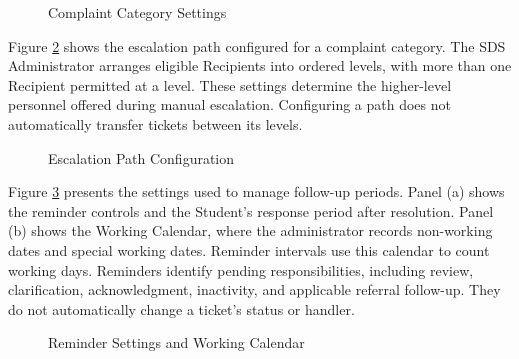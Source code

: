 \renewcommand{\thefigure}{5.37}
\begin{figure}[htbp]
    \centering
    \par{}\par
    \medskip
    \par{}\par
    \caption{Complaint Category Settings}
    \label{fig:cat}
\end{figure}
\FloatBarrier

Figure \ref{fig:path} shows the escalation path configured for a complaint category. The SDS Administrator arranges eligible Recipients into ordered levels, with more than one Recipient permitted at a level. These settings determine the higher-level personnel offered during manual escalation. Configuring a path does not automatically transfer tickets between its levels.

\renewcommand{\thefigure}{5.38}
\begin{figure}[htbp]
    \centering
    \caption{Escalation Path Configuration}
    \label{fig:path}
\end{figure}
\FloatBarrier

Figure \ref{fig:remind} presents the settings used to manage follow-up periods. Panel (a) shows the reminder controls and the Student's response period after resolution. Panel (b) shows the Working Calendar, where the administrator records non-working dates and special working dates. Reminder intervals use this calendar to count working days. Reminders identify pending responsibilities, including review, clarification, acknowledgment, inactivity, and applicable referral follow-up. They do not automatically change a ticket's status or handler.

\renewcommand{\thefigure}{5.39}
\begin{figure}[htbp]
    \centering
    \par{}\par
    \medskip
    \par{}\par
    \caption{Reminder Settings and Working Calendar}
    \label{fig:remind}
\end{figure}
\FloatBarrier

